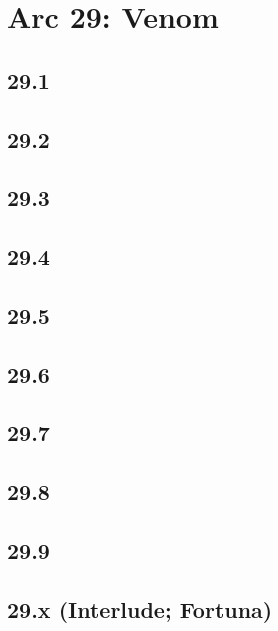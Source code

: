 \part*{Arc 29: Venom}
 \chapter*{29.1}
 \chapter*{29.2}
 \chapter*{29.3}
 \chapter*{29.4}
 \chapter*{29.5}
 \chapter*{29.6}
 \chapter*{29.7}
 \chapter*{29.8}
 \chapter*{29.9}
 \chapter*{29.x (Interlude; Fortuna)}











